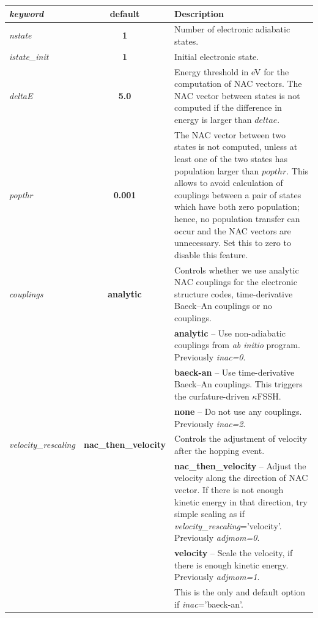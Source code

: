 \noindent\begin{tabularx}{\textwidth}{lcX}
\textit{keyword} & \textbf{default} & Description \\
\hline
\textit{nstate} & \textbf{1} & Number of electronic adiabatic states.\\
\textit{istate\_init} & \textbf{1} & Initial electronic state. \\ 

\textit{deltaE} & \textbf{5.0} & Energy threshold in eV for the computation of NAC vectors.
The NAC vector between states is not computed if the difference in energy is larger than $deltae$.\\ 
 
\textit{popthr} & \textbf{0.001} & The NAC vector between two states is not computed,
unless at least one of the two states has population larger than $popthr$. This allows to avoid calculation of couplings between a pair of states which have both zero population; hence, no population transfer can occur and the NAC vectors are unnecessary. Set this to zero to disable this feature. \\

\textit{couplings} & \textbf{analytic} & Controls whether we use analytic NAC couplings for the electronic structure codes, time-derivative Baeck--An couplings or no couplings. \\
 & & \textbf{analytic} -- Use non-adiabatic couplings from \textit{ab initio} program. Previously \textit{inac=0}. \\
 & & \textbf{baeck-an} -- Use time-derivative Baeck--An couplings. This triggers the curfature-driven $\kappa$FSSH.\cite{Jira2025}\\
 & & \textbf{none} -- Do not use any couplings. Previously \textit{inac=2}.\\


\textit{velocity\_rescaling} & \textbf{nac\_then\_velocity} & Controls the adjustment of velocity after the hopping event. \\
 & & \textbf{nac\_then\_velocity} -- Adjust the velocity along the direction of NAC vector.
 If there is not enough kinetic energy in that direction,
 try simple scaling as if \textit{velocity\_rescaling}='velocity'. Previously \textit{adjmom=0}. \\
 & & \textbf{velocity} -- Scale the velocity, if there is enough kinetic energy. Previously \textit{adjmom=1}. \\
 & & This is the only and default option if \textit{inac}='baeck-an'.  \\


\end{tabularx}

